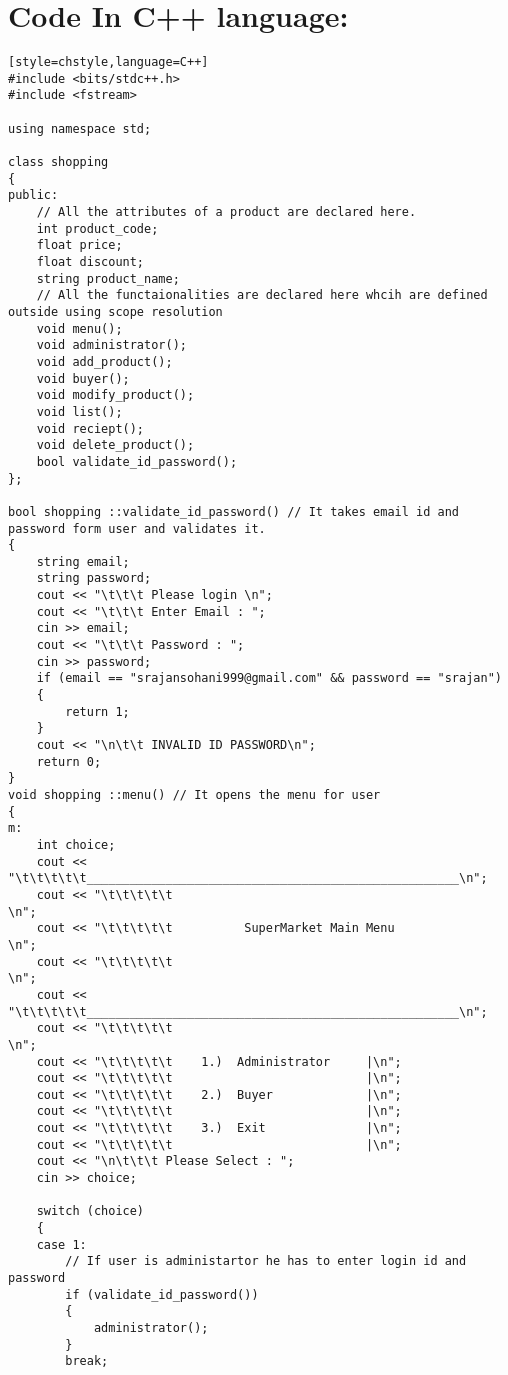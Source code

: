 \documentclass{article}
\begin{document}
\section{Code In C++ language:}
\begin{verbatim}[style=chstyle,language=C++]
#include <bits/stdc++.h>
#include <fstream>

using namespace std;

class shopping
{
public:
    // All the attributes of a product are declared here.
    int product_code;
    float price;
    float discount;
    string product_name;
    // All the functaionalities are declared here whcih are defined outside using scope resolution
    void menu();
    void administrator();
    void add_product();
    void buyer();
    void modify_product();
    void list();
    void reciept();
    void delete_product();
    bool validate_id_password();
};

bool shopping ::validate_id_password() // It takes email id and password form user and validates it.
{
    string email;
    string password;
    cout << "\t\t\t Please login \n";
    cout << "\t\t\t Enter Email : ";
    cin >> email;
    cout << "\t\t\t Password : ";
    cin >> password;
    if (email == "srajansohani999@gmail.com" && password == "srajan")
    {
        return 1;
    }
    cout << "\n\t\t INVALID ID PASSWORD\n";
    return 0;
}
void shopping ::menu() // It opens the menu for user
{
m:
    int choice;
    cout << "\t\t\t\t\t____________________________________________________\n";
    cout << "\t\t\t\t\t                                                    \n";
    cout << "\t\t\t\t\t          SuperMarket Main Menu                     \n";
    cout << "\t\t\t\t\t                                                    \n";
    cout << "\t\t\t\t\t____________________________________________________\n";
    cout << "\t\t\t\t\t                                                    \n";
    cout << "\t\t\t\t\t    1.)  Administrator     |\n";
    cout << "\t\t\t\t\t                           |\n";
    cout << "\t\t\t\t\t    2.)  Buyer             |\n";
    cout << "\t\t\t\t\t                           |\n";
    cout << "\t\t\t\t\t    3.)  Exit              |\n";
    cout << "\t\t\t\t\t                           |\n";
    cout << "\n\t\t\t Please Select : ";
    cin >> choice;

    switch (choice)
    {
    case 1:
        // If user is administartor he has to enter login id and password
        if (validate_id_password())
        {
            administrator();
        }
        break;


\end{verbatim}
\end{document}
